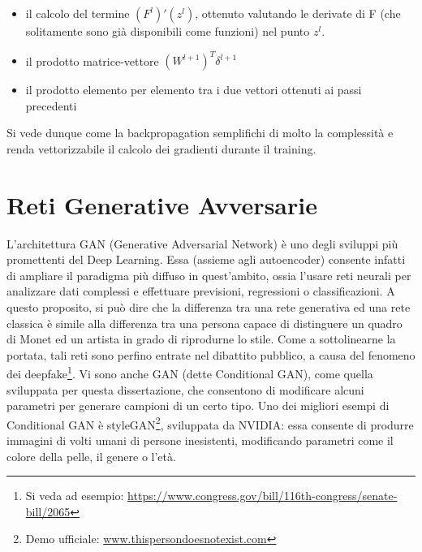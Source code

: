 \documentclass[Lau, noexaminfo, oneside]{sapthesis} %
\begin{document}
\begin{itemize}
\item il calcolo del termine $(F^l)'(z^l)$, ottenuto valutando le derivate di F (che solitamente sono già disponibili come funzioni) nel punto $z^l$.
\item il prodotto matrice-vettore $(W^{l+1})^T \delta^{l+1}$
\item il prodotto elemento per elemento tra i due vettori ottenuti ai passi precedenti
\end{itemize}
Si vede dunque come la backpropagation semplifichi di molto la complessità e renda vettorizzabile il calcolo dei gradienti durante il training.\cite{nielsenneural}
\chapter{Reti Generative Avversarie}
L'architettura GAN (Generative Adversarial Network) è uno degli sviluppi più promettenti del Deep Learning. 
Essa (assieme agli autoencoder) consente infatti di ampliare il paradigma più diffuso in quest'ambito, ossia l'usare reti neurali per analizzare dati complessi e effettuare previsioni, regressioni o classificazioni. A questo proposito, si può dire che la differenza tra una rete generativa ed una rete classica è simile alla differenza tra una persona capace di distinguere un quadro di Monet ed un artista in grado di riprodurne lo stile. Come a sottolinearne la portata, tali reti sono perfino entrate nel dibattito pubblico, a causa del fenomeno dei deepfake\footnote{Si veda ad esempio: \url{https://www.congress.gov/bill/116th-congress/senate-bill/2065}}. 
Vi sono anche GAN (dette Conditional GAN), come quella sviluppata per questa dissertazione, che consentono di modificare alcuni parametri per generare campioni di un certo tipo.
Uno dei migliori esempi di Conditional GAN è styleGAN\footnote{Demo ufficiale: \url{www.thispersondoesnotexist.com}}, sviluppata da NVIDIA: essa consente di produrre immagini di volti umani di persone inesistenti, modificando parametri come il colore della pelle, il genere o l'età.\cite{stylegan}\\
\end{document}
